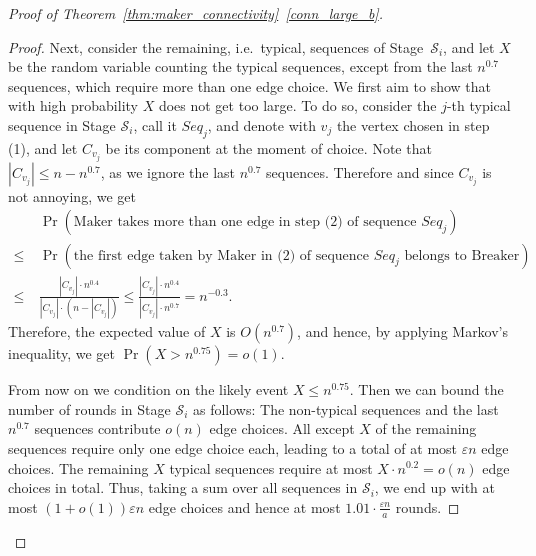 \documentclass[11pt, a4paper]{article}
\numberwithin{equation}{section}
\numberwithin{figure}{section}
\newcommand{\Prob}{\operatorname{Pr}}
\begin{document}
\begin{proof}[Proof of Theorem~\ref{thm:maker_connectivity}~\ref{conn_large_b}]
\begin{proof}
Next, consider the remaining, i.e.~typical, sequences
of Stage~$\mathcal{S}_i$,
and let $X$ be the random variable
counting the typical sequences, except from the last $n^{0.7}$ sequences, which require more than one edge choice. 
We first aim to show that with high probability $X$
does not get too large.
To do so, consider the $j$-th typical sequence in Stage $\mathcal{S}_i$, call it $Seq_j$, and denote with $v_j$ the vertex chosen in step (1), and let $C_{v_j}$ be its component at the moment of choice.
Note that $|C_{v_j}|\leq n - n^{0.7}$, as we ignore the last
$n^{0.7}$ sequences.
Therefore and since $C_{v_j}$ is not annoying, we get
\begin{align*}
&
\Prob\left(\text{Maker takes more than one edge
in step (2) of sequence $Seq_j$}\right)\\
\leq ~
&
\Prob\left(\text{the first edge taken by Maker in (2) of sequence $Seq_j$ belongs to Breaker}\right)\\
\leq ~
&
\frac{|C_{v_j}|\cdot n^{0.4}}{|C_{v_j}|\cdot (n-|C_{v_j}|)}
\leq
\frac{|C_{v_j}|\cdot n^{0.4}}{|C_{v_j}|\cdot n^{0.7}} = n^{-0.3}.
\end{align*}
Therefore, the expected value of $X$ is 
$O(n^{0.7})$, and hence,
by applying Markov's inequality, we get
$\Prob\left(X > n^{0.75}\right) = o(1)$.

From now on we condition on the likely event $X \leq n^{0.75}$. Then we can bound the number of rounds in Stage $\mathcal{S}_i$ as follows:
The non-typical sequences and the last $n^{0.7}$ sequences contribute $o(n)$ edge choices. 
All except $X$ of the remaining sequences require only one edge choice each, leading to a total of at most 
$\varepsilon n$ edge choices.
The remaining $X$ typical sequences require at most $X\cdot n^{0.2}=o(n)$ edge choices in total. Thus, taking a sum over all sequences in $\mathcal{S}_i$, 
we end up with at most 
$(1+o(1))\varepsilon n$ edge choices and hence
at most $1.01\cdot \frac{\varepsilon n}{a}$
rounds. 
\end{proof}


\end{proof}
\end{document}

